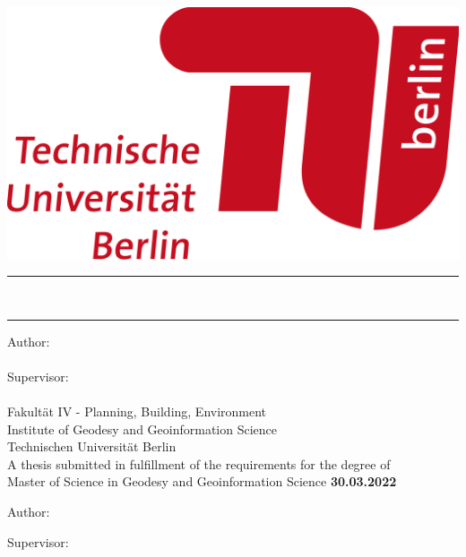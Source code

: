 

    
\begin{titlepage}
    \begin{center}
        \includegraphics[width=.25\textwidth,right]{picture/image1.png}
            \\
        \vspace*{0.8cm}
        {\Huge %
            \rule[1 ex]{\textwidth}{2 pt} %
            \textbf{\printTitle}\\
            \rule[-1 ex]{\textwidth}{2 pt} %
            }
        \vfil
        {\Large Author:} \\[0.5cm]
        { %
            {\Large \textbf{\printAuthor}} \\[0.2cm]
            }
        \vfil
        {\Large Supervisor: }\\ [0.5cm]
        { %
            {\Large \textbf{\printSupervisor}} \\[0.2cm]
        }
        \vfil
        {Fakult\"at IV - Planning, Building, Environment \\Institute of Geodesy and Geoinformation Science  \\ Technischen Universit\"at Berlin } \\[2 pt]
        \vfil
        {A thesis submitted in fulfillment of the requirements for the degree of \\ Master of Science in Geodesy and Geoinformation Science}
        \vfil
        {\large\textbf{30.03.2022} \printDate}
    \end{center}
\end{titlepage}

\restoregeometry


\hfill
\vfill

\noindent \textit{\printTitle} 

\bigskip

\noindent Author:\\
{\printAuthor}

\medskip

\noindent Supervisor:\\
{\printSupervisor}
